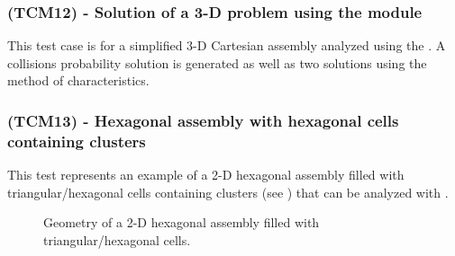 
\subsubsection{\tst(TCM12) - Solution of a 3-D problem using the 
module}\label{sect:ExTCM12}

This test case is for a simplified 3-D Cartesian assembly analyzed using the . A
collisions probability solution is generated as well as two solutions using the method of
characteristics.


\subsubsection{\tst(TCM13) - Hexagonal assembly with hexagonal cells containing clusters}\label{sect:ExTCM13}

This test represents an example of a 2-D hexagonal assembly filled with triangular/hexagonal cells containing clusters (see ) that can be analyzed with .

\begin{figure}[h!]  
\begin{center} 
\parbox{10.0cm}{\epsfxsize=10cm }
\parbox{14cm}{\caption{Geometry of a 2-D hexagonal assembly filled with triangular/hexagonal cells.}\label{fig:TCM13}}   
\end{center}  
\end{figure}


\eject
